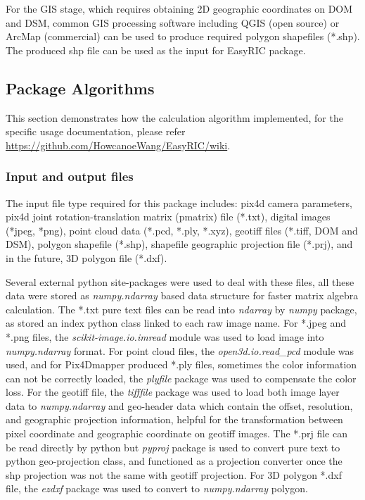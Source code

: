 \documentclass{configs/bmcart}
\begin{document}
For the GIS stage, which requires obtaining 2D geographic coordinates on DOM and DSM, common GIS processing software including QGIS (open source) or ArcMap (commercial) can be used to produce required polygon shapefiles (*.shp). The produced shp file can be used as the input for EasyRIC package.

\subsection*{Package Algorithms}
This section demonstrates how the calculation algorithm implemented, for the specific usage documentation, please refer \url{https://github.com/HowcanoeWang/EasyRIC/wiki}.

\subsubsection*{Input and output files}
The input file type required for this package includes: pix4d camera parameters, pix4d joint rotation-translation matrix (pmatrix) file (*.txt), digital images (*jpeg, *png), point cloud data (*.pcd, *.ply, *.xyz), geotiff files (*.tiff, DOM and DSM), polygon shapefile (*.shp), shapefile geographic projection file (*.prj), and in the future, 3D polygon file (*.dxf).

Several external python site-packages were used to deal with these files, all these data were stored as \textit{numpy.ndarray} based data structure for faster matrix algebra calculation. The *.txt pure text files can be read into \textit{ndarray} by \textit{numpy} package, as stored an index python class linked to each raw image name. For *.jpeg and *.png files, the \textit{scikit-image.io.imread} module was used to load image into \textit{numpy.ndarray} format. For point cloud files, the \textit{open3d.io.read\_pcd} module was used, and for Pix4Dmapper produced *.ply files, sometimes the color information can not be correctly loaded, the \textit{plyfile} package was used to compensate the color loss. For the geotiff file, the \textit{tifffile} package was used to load both image layer data to \textit{numpy.ndarray} and geo-header data which contain the offset, resolution, and geographic projection information, helpful for the transformation between pixel coordinate and geographic coordinate on geotiff images. The *.prj file can be read directly by python but \textit{pyproj} package is used to convert pure text to python geo-projection class, and functioned as a projection converter once the shp projection was not the same with geotiff projection. For 3D polygon *.dxf file, the \textit{ezdxf} package was used to convert to \textit{numpy.ndarray} polygon.
\end{document}
